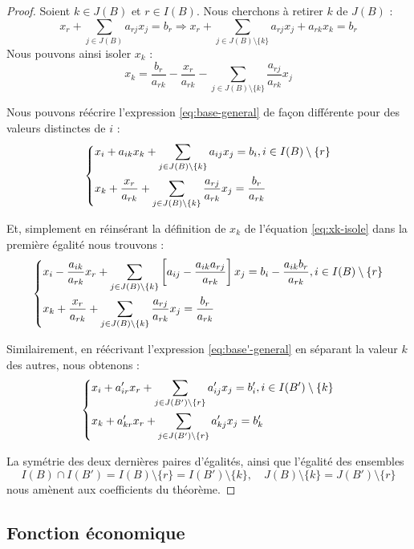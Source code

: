 \documentclass[a4paper]{report}
\theoremstyle{definition}
\theoremstyle{remark}
\theoremstyle{plain}
\begin{document}
\begin{proof}
Soient $k \in J(B)$ et $r \in I(B)$. Nous cherchons à retirer $k$ de $J(B)$ :
\[ x_r + \sum_{j \in J(B)}{a_{rj}x_j} = b_r \Rightarrow x_r + \sum_{j \in J(B) \setminus \{k\}}{a_{rj}x_j} + a_{rk}x_k = b_r \]
Nous pouvons ainsi isoler $x_k$ :
\begin{equation}
\label{eq:xk-isole}
x_k = \frac{b_r}{a_{rk}} - \frac{x_r}{a_{rk}} - \sum_{j \in J(B) \setminus \{k\}}{\frac{a_{rj}}{a_{rk}} x_j}
\end{equation}

Nous pouvons réécrire l'expression \ref{eq:base-general} de façon différente pour des valeurs distinctes de $i$ :
\[\begin{dcases}
	x_i + a_{ik}x_k + \sum_{j \in J(B) \setminus \{k\}}{a_{ij}x_j} = b_i , i \in I(B) \setminus \{r\} \\
	x_k + \frac{x_r}{a_{rk}} + \sum_{j \in J(B) \setminus \{k\}}{\frac{a_{rj}}{a_{rk}}} x_j = \frac{b_r}{a_{rk}}
\end{dcases}\]

Et, simplement en réinsérant la définition de $x_k$ de l'équation \ref{eq:xk-isole} dans la première égalité nous trouvons :
\[\begin{dcases}
	x_i - \frac{a_{ik}}{a_{rk}}x_r + \sum_{j \in J(B) \setminus \{k\}}{ \left[ a_{ij} - \frac{a_{ik}a_{rj}}{a_{rk}} \right] x_j} = b_i - \frac{a_{ik}b_r}{a_{rk}} , i \in I(B) \setminus \{r\} \\
	x_k + \frac{x_r}{a_{rk}} + \sum_{j \in J(B) \setminus \{k\}}{\frac{a_{rj}}{a_{rk}}} x_j = \frac{b_r}{a_{rk}}
\end{dcases}\]

Similairement, en réécrivant l'expression \ref{eq:base'-general} en séparant la valeur $k$ des autres, nous obtenons :
\[\begin{dcases}
	x_i + a'_{ir}x_r + \sum_{j \in J(B') \setminus \{r\}}{a'_{ij}x_j} = b'_i , i \in I(B') \setminus \{k\} \\
	x_k + a'_{kr}x_r + \sum_{j \in J(B') \setminus \{r\}}{a'_{kj} x_j} = b'_k
\end{dcases}\]

La symétrie des deux dernières paires d'égalités, ainsi que l'égalité des ensembles
\[I(B) \cap I(B') = I(B) \setminus \{r\} = I(B') \setminus \{k\} , \quad J(B) \setminus \{k\} = J(B') \setminus \{r\}\]
nous amènent aux coefficients du théorème.
\end{proof}

\subsection{Fonction économique}
\end{document}

